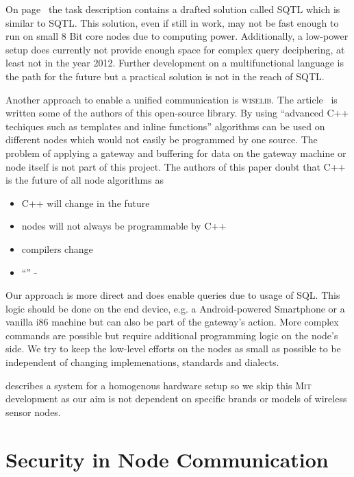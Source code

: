 On page~\pageref{chap:unify} the task description contains a drafted solution called \textsc{SQTL} which is similar to \textsc{SQTL}. This
solution, even if still in work, may not be fast enough to run on small 8 Bit core nodes due to computing power. Additionally, a low-power 
setup does currently not provide enough space for complex query deciphering, at least not in the year 2012. Further development on a 
multifunctional language is the path for the future but a practical solution is not in the reach of \textsc{SQTL}.

Another approach to enable a unified communication is \textsc{wiselib}. The article~\cite{wiselib} is written some of the authors of this
open-source library. By using ``advanced C++ techiques such as templates and inline functions'' algorithms can be used on different nodes
which would not easily be programmed by one source. The problem of applying a gateway and buffering for data on the gateway machine or node itself
is not part of this project. The authors of this paper doubt that C++ is the future of all node algorithms as

\begin{itemize}
    \item C++ will change in the future
    \item nodes will not always be programmable by C++
    \item compilers change
    \item ``'' - 
\end{itemize}

Our approach is more direct and does enable queries due to usage of \textsc{SQL}. 
This logic should be done on the end device, e.g. a Android-powered Smartphone or a 
vanilla i86 machine but can also be part of the gateway's action. 
More complex commands are possible but require additional programming logic on the node's side. We try to 
keep the low-level efforts on the nodes as small as possible to be independent of changing implemenations, standards and dialects.

\cite{Heinzelman00energy-efficientcommunication} describes a system for a homogenous hardware setup so we skip this \textsc{Mit} development as 
our aim is not dependent on specific brands or models of wireless sensor nodes.

\section{Security in Node Communication}

